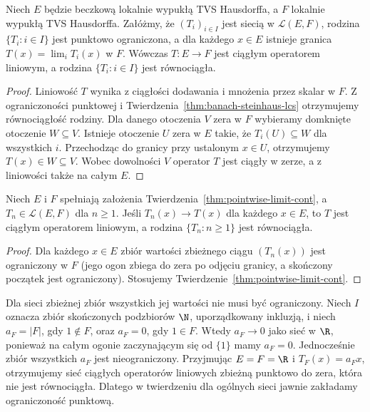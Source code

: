 \begin{twierdzenie}\label{thm:pointwise-limit-cont}
Niech $E$ będzie beczkową lokalnie wypukłą TVS Hausdorffa,
a $F$ lokalnie wypukłą TVS Hausdorffa. Załóżmy, że
$(T_i)_{i\in I}$ jest siecią w $\mathcal L(E,F)$,
rodzina $\{T_i:i\in I\}$ jest punktowo ograniczona,
a dla każdego $x\in E$ istnieje granica
$T(x)=\lim_iT_i(x)$ w $F$. Wówczas $T:E\to F$
jest ciągłym operatorem liniowym, a rodzina
$\{T_i:i\in I\}$ jest równociągła.
\end{twierdzenie}
\begin{proof}
Liniowość $T$ wynika z ciągłości dodawania i mnożenia
przez skalar w $F$. Z ograniczoności punktowej i
Twierdzenia~\ref{thm:banach-steinhaus-lcs} otrzymujemy
równociągłość rodziny. Dla danego otoczenia $V$ zera
w $F$ wybieramy domknięte otoczenie $W\subseteq V$.
Istnieje otoczenie $U$ zera w $E$ takie, że
$T_i(U)\subseteq W$ dla wszystkich $i$.
Przechodząc do granicy przy ustalonym $x\in U$, otrzymujemy
$T(x)\in W\subseteq V$. Wobec dowolności $V$ operator
$T$ jest ciągły w zerze, a z liniowości także na całym $E$.
\end{proof}

\begin{wniosek}
\label{cor:sequence-operators}
Niech $E$ i $F$ spełniają założenia
Twierdzenia~\ref{thm:pointwise-limit-cont}, a
$T_n\in\mathcal L(E,F)$ dla $n\ge1$. Jeśli
$T_n(x)\to T(x)$ dla każdego $x\in E$, to $T$ jest
ciągłym operatorem liniowym, a rodzina $\{T_n:n\ge1\}$
jest równociągła.
\end{wniosek}
\begin{proof}
Dla każdego $x\in E$ zbiór wartości zbieżnego ciągu
$(T_n(x))$ jest ograniczony w $F$ (jego ogon zbiega do zera
po odjęciu granicy, a skończony początek jest ograniczony).
Stosujemy Twierdzenie~\ref{thm:pointwise-limit-cont}.
\end{proof}

\begin{uwaga}
Dla sieci zbieżnej zbiór wszystkich jej wartości nie musi
być ograniczony. Niech $I$ oznacza zbiór skończonych
podzbiorów $\N$, uporządkowany inkluzją, i niech
$a_F=|F|$, gdy $1\notin F$, oraz $a_F=0$, gdy $1\in F$.
Wtedy $a_F\to0$ jako sieć w $\R$, ponieważ na całym
ogonie zaczynającym się od $\{1\}$ mamy $a_F=0$.
Jednocześnie zbiór wszystkich $a_F$ jest nieograniczony.
Przyjmując $E=F=\R$ i $T_F(x)=a_Fx$, otrzymujemy sieć
ciągłych operatorów liniowych zbieżną punktowo do zera,
która nie jest równociągła. Dlatego w twierdzeniu dla
ogólnych sieci jawnie zakładamy ograniczoność punktową.
\end{uwaga}

